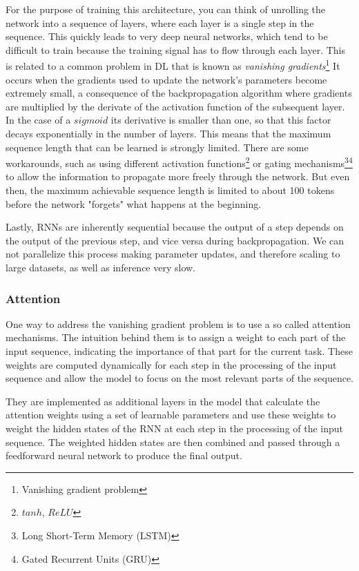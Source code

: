 For the purpose of training this architecture, you can think of unrolling the network into a sequence of layers, where each layer is a single step in the sequence.
This quickly leads to very deep neural networks, which tend to be difficult to train because the training signal has to flow through each layer.
This is related to a common problem in DL that is known as \textit{vanishing gradients}\footnote{Vanishing gradient problem}
It occurs when the gradients used to update the network's parameters become extremely small, a consequence of the backpropagation algorithm where gradients are multiplied by the derivate of the activation function of the subsequent layer.
In the case of a $sigmoid$ its derivative is smaller than one, so that this factor decays exponentially in the number of layers.
This means that the maximum sequence length that can be learned is strongly limited.
There are some workarounds, such as using different activation functions\footnote{$tanh$, $ReLU$} or gating mechanisms\footnote{Long Short-Term Memory (LSTM)}\footnote{Gated Recurrent Units (GRU)} to allow the information to propagate more freely through the network.
But even then, the maximum achievable sequence length is limited to about 100 tokens before the network "forgets" what happens at the beginning.

Lastly, RNNs are inherently sequential because the output of a step depends on the output of the previous step, and vice versa during backpropagation.
We can not parallelize this process making parameter updates, and therefore scaling to large datasets, as well as inference very slow.

\subsubsection*{Attention}
One way to address the vanishing gradient problem is to use a so called attention mechanisms.\cite{https://doi.org/10.48550/arxiv.1409.0473}
The intuition behind them is to assign a weight to each part of the input sequence, indicating the importance of that part for the current task.
These weights are computed dynamically for each step in the processing of the input sequence and allow the model to focus on the most relevant parts of the sequence.

They are implemented as additional layers in the model that calculate the attention weights using a set of learnable parameters and use these weights to weight the hidden states of the RNN at each step in the processing of the input sequence.
The weighted hidden states are then combined and passed through a feedforward neural network to produce the final output.


